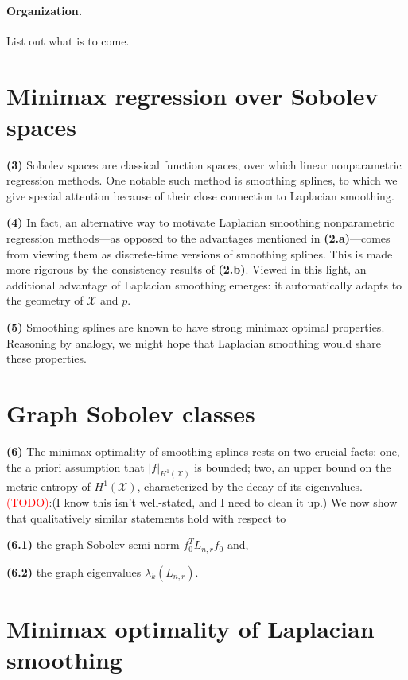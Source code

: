 \documentclass{article}
\newcommand{\1}{\mathbf{1}}
\newcommand{\Lap}{L}
\newcommand{\Xset}{\mathcal{X}}
\theoremstyle{alden}
\theoremstyle{aldenthm}
\theoremstyle{definition}
\theoremstyle{remark}
\begin{document}
\paragraph{Organization.}

List out what is to come.

\section{Minimax regression over Sobolev spaces}

\textbf{(3)} Sobolev spaces are classical function spaces, over which linear nonparametric regression methods. One notable such method is smoothing splines, to which we give special attention because of their close connection to Laplacian smoothing.

\textbf{(4)} In fact, an alternative way to motivate Laplacian smoothing nonparametric regression methods---as opposed to the advantages mentioned in \textbf{(2.a)}---comes from viewing them as discrete-time versions of smoothing splines. This is made more rigorous by the consistency results of \textbf{(2.b)}. Viewed in this light, an additional advantage of Laplacian smoothing emerges: it automatically adapts to the geometry of $\Xset$ and $p$. 

\textbf{(5)} Smoothing splines are known to have strong minimax optimal properties. Reasoning by analogy, we might hope that Laplacian smoothing would share these properties. 

\section{Graph Sobolev classes}

\textbf{(6)} The minimax optimality of smoothing splines rests on two crucial facts: one, the a priori assumption that $|f|_{H^1(\Xset)}$ is bounded; two, an upper bound on the metric entropy of $H^1(\Xset)$, characterized by the decay of its eigenvalues. \textcolor{red}{(TODO)}:(I know this isn't well-stated, and I need to clean it up.)  We now show that qualitatively similar statements hold with respect to 

\quad \textbf{(6.1)} the graph Sobolev semi-norm $f_0^T \Lap_{n,r} f_0$ and,
 
\quad \textbf{(6.2)} the graph eigenvalues $\lambda_k(\Lap_{n,r})$. 

\section{Minimax optimality of Laplacian smoothing}
\end{document}
